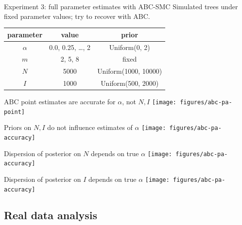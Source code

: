\documentclass{beamer}
\begin{document}
\begin{frame}{Experiment 3: full parameter estimates with ABC-SMC}
  Simulated trees under fixed parameter values; try to recover with ABC. 

  \begin{center}
    \begin{tabular}{ccc}
      \textbf{parameter} & \textbf{value} & \textbf{prior} \\
      \hline
      $\alpha$ & 0.0, 0.25, \ldots, 2 & Uniform(0, 2) \\
      $m$ & 2, 5, 8 & fixed \\
      $N$ & 5000 & Uniform(1000, 10000) \\
      $I$ & 1000 & Uniform(500, 2000) \\
      \hline
    \end{tabular}
  \end{center}
\end{frame}

\begin{frame}{ABC point estimates are accurate for $\alpha$, not $N, I$}
  \vspace{-0.5cm}
  \texttt{[image: figures/abc-pa-point]}
\end{frame}

\begin{frame}{Priors on $N, I$ do not influence estimates of $\alpha$}
  \vspace{-0.5cm}
  \texttt{[image: figures/abc-pa-accuracy]}
\end{frame}

\begin{frame}{Dispersion of posterior on $N$ depends on true $\alpha$}
  \vspace{-0.5cm}
  \texttt{[image: figures/abc-pa-accuracy]}
\end{frame}

\begin{frame}{Dispersion of posterior on $I$ depends on true $\alpha$}
  \vspace{-0.5cm}
  \texttt{[image: figures/abc-pa-accuracy]}
\end{frame}

\subsection{Real data analysis}
\end{document}
